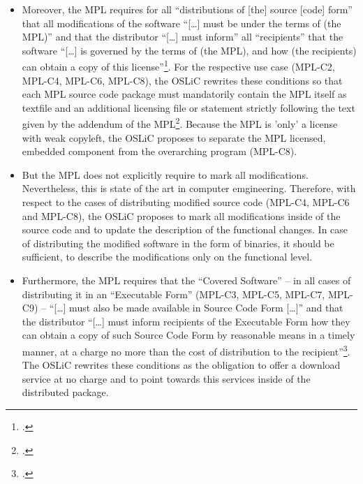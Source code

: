 \begin{itemize}
  \item Moreover, the MPL requires for all \enquote{distributions of [the]
  source [code] form} that all modifications of the software \enquote{[\ldots]
  must be under the terms of (the MPL)} and that the distributor
  \enquote{[\ldots] must inform} all \enquote{recipients} that the software
  \enquote{[\ldots] is governed by the terms of (the MPL), and how (the
  recipients) can obtain a copy of this license}\footcite[cf.][\nopage wp.\
  §3.1]{Mpl20OsiLicense2013a}. For the respective use case (MPL-C2, MPL-C4, MPL-C6,
  MPL-C8), the OSLiC rewrites these conditions so that each MPL source code
  package must mandatorily contain the MPL itself as textfile and an additional
  licensing file or statement strictly following the text given by the addendum
  of the MPL\footcite[cf.][\nopage wp.\ Exhibit A]{Mpl20OsiLicense2013a}. Because
  the MPL is 'only' a license with weak copyleft, the OSLiC proposes to separate
  the MPL licensed, embedded component from the overarching program (MPL-C8).
  
  \item But the MPL does not explicitly require to mark all modifications.
  Nevertheless, this is state of the art in computer emgineering. Therefore,
  with respect to the cases of distributing modified source code (MPL-C4, MPL-C6
  and MPL-C8), the OSLiC proposes to mark all modifications inside of the source
  code and to update the description of the functional changes. In case of
  distributing the modified software in the form of binaries, it should be
  sufficient, to describe the modifications only on the functional level.
  
  \item Furthermore, the MPL requires that the \enquote{Covered Software} -- in
  all cases of distributing it in an \enquote{Executable Form} (MPL-C3, MPL-C5,
  MPL-C7, MPL-C9) -- \enquote{[\ldots] must also be made available in Source Code
  Form [\ldots]} and that the distributor \enquote{[\ldots] must inform
  recipients of the Executable Form how they can obtain a copy of such Source
  Code Form by reasonable means in a timely manner, at a charge no more than the
  cost of distribution to the recipient}\footcite[cf.][\nopage wp.\
  §3.2.a]{Mpl20OsiLicense2013a}. The OSLiC rewrites these conditions as the
  obligation to offer a download service at no charge and to point towards this
  services inside of the distributed package.
  

\end{itemize}
